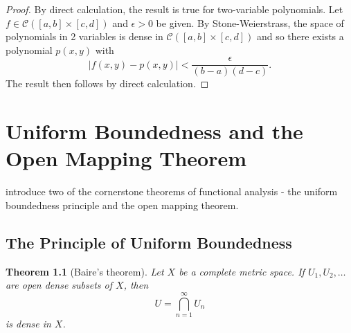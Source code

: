 \documentclass[justified]{tufte-book}
\theoremstyle{plain}%
\newtheorem{thm}{Theorem}[chapter]
\theoremstyle{definition}
\theoremstyle{remark}
\begin{document}
\begin{proof}
  By direct calculation, the result is true for two-variable polynomials.  Let $f \in \mathcal C([a,b] \times [c,d])$ and $\epsilon > 0$ be given.  By Stone-Weierstrass, the space of polynomials in 2 variables is dense in $\mathcal C([a,b] \times [c,d])$ and so there exists a polynomial $p(x,y)$ with \[
      |f(x,y) - p(x,y)| < \frac{\epsilon}{(b-a)(d-c)}.
  \]  The result then follows by direct calculation.
\end{proof}

\chapter{Uniform Boundedness and the Open Mapping Theorem}

 introduce two of the cornerstone theorems of functional analysis - the uniform boundedness principle and the open mapping theorem.

\section{The Principle of Uniform Boundedness}
\begin{thm}[Baire's theorem]
  Let $X$ be a complete metric space.  If $U_1, U_2, \dots$ are open dense subsets of $X$, then \[
      U = \bigcap_{n=1}^\infty U_n
  \] is dense in $X$.  
\end{thm}
\end{document}
